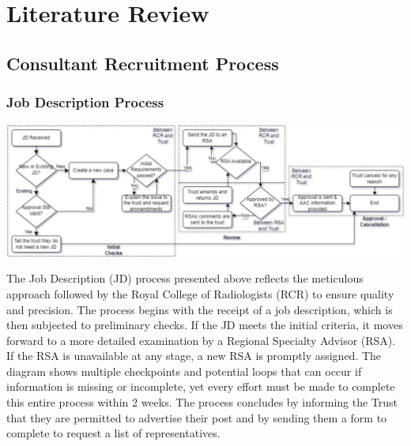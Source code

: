 \section{Literature Review}
\subsection{Consultant Recruitment Process}
\subsubsection{Job Description Process}
\begin{center}
\includegraphics[width=0.9\linewidth]{images/jd.png}
\end{center}
\vspace{-2em}
\begin{multicols}{2}
The Job Description (JD) process presented above reflects the meticulous approach followed by the Royal College of Radiologists (RCR) to ensure quality and precision. The process begins with the receipt of a job description, which is then subjected to preliminary checks. If the JD meets the initial criteria, it moves forward to a more detailed examination by a Regional Specialty Advisor (RSA). If the RSA is unavailable at any stage, a new RSA is promptly assigned. The diagram shows multiple checkpoints and potential loops that can occur if information is missing or incomplete, yet every effort must be made to complete this entire process within 2 weeks. The process concludes by informing the Trust that they are permitted to advertise their post and by sending them a form to complete to request a list of representatives.
\end{multicols}
